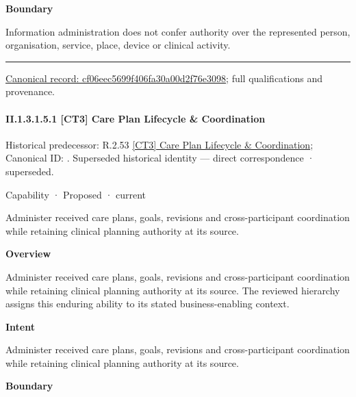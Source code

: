 \textbf{Boundary}



Information administration does not confer authority over the represented person, organisation, service, place, device or clinical activity.



\medskip\hrule\medskip

{\footnotesize \href{../../../../../../../continuum/strategy/capability/cf06eec5699f406fa30a00d2f76e3098.md}{Canonical record: cf06eec5699f406fa30a00d2f76e3098}; full qualifications and provenance.}\par
\paragraph*{II.1.3.1.5.1 [CT3] Care Plan Lifecycle \& Coordination}
\label{navigation:II.1.3.1.5.1}

{\small Historical predecessor: R.2.53 \hyperref[element:689bb3f8a24249b79f787e1f48eb268d]{[CT3] Care Plan Lifecycle \& Coordination}; Canonical ID: \texttt{}. Superseded historical identity — direct correspondence · superseded.}\par
\label{element:4cb7db65392f4fab801d7794af4d4b29}
{\small Capability · Proposed · current}\par

Administer received care plans, goals, revisions and cross-participant coordination while retaining clinical planning authority at its source.



\textbf{Overview}



Administer received care plans, goals, revisions and cross-participant coordination while retaining clinical planning authority at its source. The reviewed hierarchy assigns this enduring ability to its stated business-enabling context.



\textbf{Intent}



Administer received care plans, goals, revisions and cross-participant coordination while retaining clinical planning authority at its source.



\textbf{Boundary}



